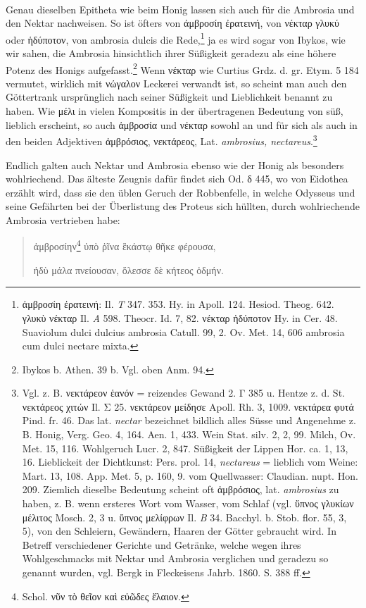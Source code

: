\documentclass[a4paper, 11pt, oneside]{article}
\begin{document}
\paragraph{}
Genau dieselben Epitheta wie beim Honig lassen sich auch für die Ambrosia und den Nektar nachweisen. So ist öfters von ἀμβροσίη ἐρατεινή, von νέκταρ γλυκύ oder ἡδύποτον, von ambrosia dulcis die Rede,\footnote{ἀμβροσίη ἐρατεινή: Il. \emph{T} 347. 353. Hy. in Apoll. 124. Hesiod. Theog. 642. γλυκὺ νέκταρ Il. \emph{A} 598. Theocr. Id. 7, 82. νέκταρ ἡδύποτον Hy. in Cer. 48. Suaviolum dulci dulcius ambrosia Catull. 99, 2. Ov. Met. 14, 606 ambrosia cum dulci nectare mixta.} ja es wird sogar von Ibykos, wie wir sahen, die Ambrosia hinsichtlich ihrer Süßigkeit geradezu als eine höhere Potenz des Honigs aufgefasst.\footnote{Ibykos b. Athen. 39 b. Vgl. oben Anm. 94.} Wenn νέκταρ wie Curtius Grdz. d. gr. Etym. 5 184 vermutet, wirklich mit νώγαλον Leckerei verwandt ist, so scheint man auch den Göttertrank ursprünglich nach seiner Süßigkeit und Lieblichkeit benannt zu haben. Wie μέλι in vielen Kompositis in der übertragenen Bedeutung von süß, lieblich erscheint, so auch ἀμβροσία und νέκταρ sowohl an und für sich als auch in den beiden Adjektiven ἀμβρόσιος, νεκτάρεος, Lat. \emph{ambrosius, nectareus}.\footnote{Vgl. z. B. νεκτάρεον ἑανόν = reizendes Gewand 2. Γ 385 u. Hentze z. d. St. νεκτάρεος χιτών Il. Σ 25. νεκτάρεον μείδησε Apoll. Rh. 3, 1009. νεκτάρεα φυτά Pind. fr. 46. Das lat. \emph{nectar} bezeichnet bildlich alles Süsse und Angenehme z. B. Honig, Verg. Geo. 4, 164. Aen. 1, 433. Wein Stat. silv. 2, 2, 99. Milch, Ov. Met. 15, 116. Wohlgeruch Lucr. 2, 847. Süßigkeit der Lippen Hor. ca. 1, 13, 16. Lieblickeit der Dichtkunst: Pers. prol. 14, \emph{nectareus} = lieblich vom Weine: Mart. 13, 108. App. Met. 5, p. 160, 9. vom Quellwasser: Claudian. nupt. Hon. 209. Ziemlich dieselbe Bedeutung scheint oft ἀμβρόσιος, lat. \emph{ambrosius} zu haben, z. B. wenn ersteres Wort vom Wasser, vom Schlaf (vgl. ὕπνος γλυκίων μέλιτος Mosch. 2, 3 u. ὕπνος μελίφρων Il. \emph{B} 34. Bacchyl. b. Stob. flor. 55, 3, 5), von den Schleiern, Gewändern, Haaren der Götter gebraucht wird. In Betreff verschiedener Gerichte und Getränke, welche wegen ihres Wohlgeschmacks mit Nektar und Ambrosia verglichen und geradezu so genannt wurden, vgl. Bergk in Fleckeisens Jahrb. 1860. S. 388 ff.}

Endlich galten auch Nektar und Ambrosia ebenso wie der Honig als besonders wohlriechend. Das älteste Zeugnis dafür findet sich Od. δ 445, wo von Eidothea erzählt wird, dass sie den üblen Geruch der Robbenfelle, in welche Odysseus und seine Gefährten bei der Überlistung des Proteus sich hüllten, durch wohlriechende Ambrosia vertrieben habe:
\begin{quotation}
ἀμβροσίην\footnote{Schol. νῦν τὸ θεῖον καὶ εὐῶδες ἔλαιον.} ὑπὸ ῥῖνα ἓκάστῳ θῆκε φέρουσα,

ἡδὺ μάλα πνείουσαν, ὅλεσσε δὲ κήτεος ὀδμήν.
\end{quotation}
\end{document}
